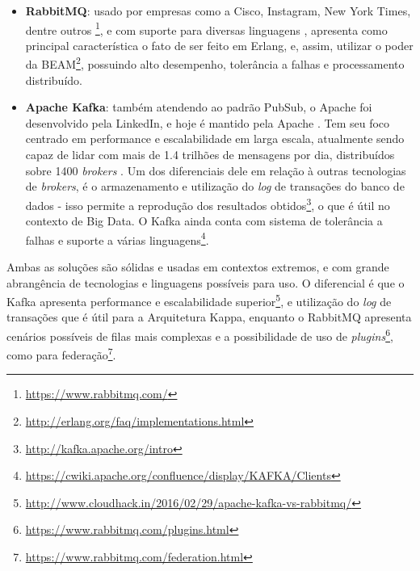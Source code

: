 \begin{itemize}

    \item \textbf{RabbitMQ}: usado por empresas como a Cisco, Instagram,
        New York Times, dentre outros \footnote{\url{https://www.rabbitmq.com/}},
        e com suporte para diversas linguagens \cite{zaitsev2014}, apresenta
        como principal característica o fato de ser feito em Erlang, e, assim,
        utilizar o poder da
        BEAM\footnote{\url{http://erlang.org/faq/implementations.html}},
        possuindo alto desempenho, tolerância a falhas e processamento
        distribuído.

    \item \textbf{Apache Kafka}: também atendendo ao padrão PubSub, o Apache
        foi desenvolvido pela LinkedIn, e hoje é mantido pela Apache
        \cite{koshy2016}. Tem seu foco centrado em performance e escalabilidade
        em larga escala, atualmente sendo capaz de lidar com mais de 1.4
        trilhões de mensagens por dia, distribuídos sobre 1400
        \textit{brokers} \cite{koshy2016}. Um dos diferenciais dele em relação
        à outras tecnologias de \textit{brokers}, é o armazenamento e
        utilização do \textit{log} de transações do banco de dados - isso
        permite a reprodução dos resultados
        obtidos\footnote{\url{http://kafka.apache.org/intro}}, o que é útil no
        contexto de Big Data. O Kafka ainda conta com sistema de tolerância
        a falhas e suporte a várias
        linguagens\footnote{\url{https://cwiki.apache.org/confluence/display/KAFKA/Clients}}.

\end{itemize}

Ambas as soluções são sólidas e usadas em contextos extremos, e com grande
abrangência de tecnologias e linguagens possíveis para uso. O diferencial é que
o Kafka apresenta performance e escalabilidade
superior\footnote{\url{http://www.cloudhack.in/2016/02/29/apache-kafka-vs-rabbitmq/}},
e utilização do \textit{log} de transações que é útil para a Arquitetura Kappa,
enquanto o RabbitMQ apresenta cenários possíveis de filas mais complexas e a
possibilidade de uso de
\textit{plugins}\footnote{\url{https://www.rabbitmq.com/plugins.html}},
como para federação\footnote{\url{https://www.rabbitmq.com/federation.html}}.

